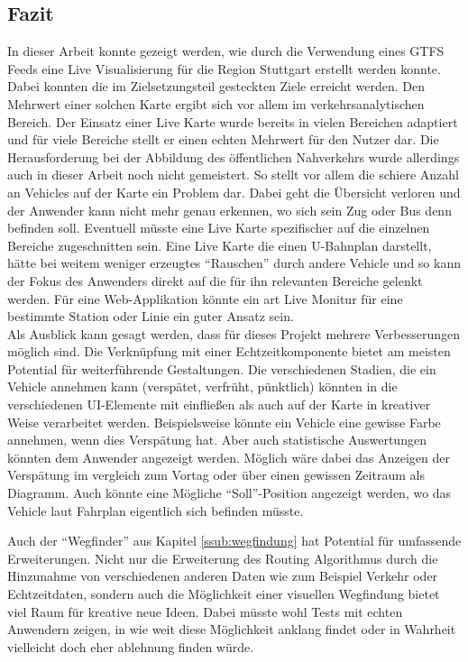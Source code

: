 
\begin{newpage}
  \section{Fazit}
  \label{sec:fazit}
    In dieser Arbeit konnte gezeigt werden, wie durch die Verwendung eines GTFS Feeds eine Live Visualisierung für die Region Stuttgart erstellt werden konnte. Dabei konnten die im Zielsetzungsteil gesteckten Ziele erreicht werden. Den Mehrwert einer solchen Karte ergibt sich vor allem im verkehrsanalytischen Bereich. Der Einsatz einer Live Karte wurde bereits in vielen Bereichen adaptiert und für viele Bereiche stellt er einen echten Mehrwert für den Nutzer dar. Die Herausforderung bei der Abbildung des öffentlichen Nahverkehrs wurde allerdings auch in dieser Arbeit noch nicht gemeistert. So stellt vor allem die schiere Anzahl an Vehicles auf der Karte ein Problem dar. Dabei geht die Übersicht verloren und der Anwender kann nicht mehr genau erkennen, wo sich sein Zug oder Bus denn befinden soll. Eventuell müsste eine Live Karte spezifischer auf die einzelnen Bereiche zugeschnitten sein. Eine Live Karte die einen U-Bahnplan darstellt, hätte bei weitem weniger erzeugtes "`Rauschen"' durch andere Vehicle und so kann der Fokus des Anwenders direkt auf die für ihn relevanten Bereiche gelenkt werden. Für eine Web-Applikation könnte ein art Live Monitur für eine bestimmte Station oder Linie ein guter Ansatz sein.\\

    Als Ausblick kann gesagt werden, dass für dieses Projekt mehrere Verbesserungen möglich sind. Die Verknüpfung mit einer Echtzeitkomponente bietet am meisten Potential für weiterführende Gestaltungen. Die verschiedenen Stadien, die ein Vehicle annehmen kann (verspätet, verfrüht, pünktlich) könnten in die verschiedenen UI-Elemente mit einfließen als auch auf der Karte in kreativer Weise verarbeitet werden. Beispielsweise könnte ein Vehicle eine gewisse Farbe annehmen, wenn dies Verspätung hat. Aber auch statistische Auswertungen könnten dem Anwender angezeigt werden. Möglich wäre dabei das Anzeigen der Verspätung im vergleich zum Vortag oder über einen gewissen Zeitraum als Diagramm. Auch könnte eine Mögliche "`Soll"'-Position angezeigt werden, wo das Vehicle laut Fahrplan eigentlich sich befinden müsste.

    Auch der "`Wegfinder"' aus Kapitel \ref{ssub:wegfindung} hat Potential für umfassende Erweiterungen. Nicht nur die Erweiterung des Routing Algorithmus durch die Hinzunahme von verschiedenen anderen Daten wie zum Beispiel Verkehr oder Echtzeitdaten, sondern auch die Möglichkeit einer visuellen Wegfindung bietet viel Raum für kreative neue Ideen. Dabei müsste wohl Tests mit echten Anwendern zeigen, in wie weit diese Möglichkeit anklang findet oder in Wahrheit vielleicht doch eher ablehnung finden würde.

\end{newpage}